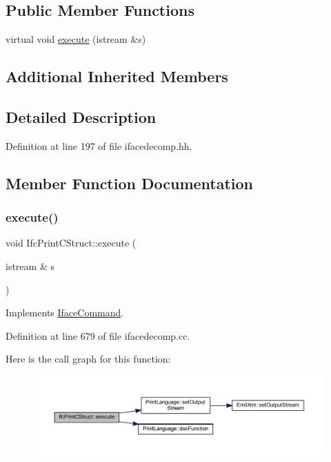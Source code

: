 \subsection*{Public Member Functions}
\begin{DoxyCompactItemize}
\item 
virtual void \mbox{\hyperlink{class_ifc_print_c_struct_a12d8b638868ba6f7eaa84e88421c0ab1}{execute}} (istream \&s)
\end{DoxyCompactItemize}
\subsection*{Additional Inherited Members}


\subsection{Detailed Description}


Definition at line 197 of file ifacedecomp.\+hh.



\subsection{Member Function Documentation}
\mbox{\label{class_ifc_print_c_struct_a12d8b638868ba6f7eaa84e88421c0ab1}} 
\subsubsection{\texorpdfstring{execute()}{execute()}}
{\footnotesize\ttfamily void Ifc\+Print\+C\+Struct\+::execute (\begin{DoxyParamCaption}\item[{istream \&}]{s }\end{DoxyParamCaption})\hspace{0.3cm}{\ttfamily [virtual]}}



Implements \mbox{\hyperlink{class_iface_command_af10e29cee2c8e419de6efe9e680ad201}{Iface\+Command}}.



Definition at line 679 of file ifacedecomp.\+cc.

Here is the call graph for this function\+:
\nopagebreak
\begin{figure}[H]
\begin{center}
\leavevmode
\includegraphics[width=350pt]{class_ifc_print_c_struct_a12d8b638868ba6f7eaa84e88421c0ab1_cgraph}
\end{center}
\end{figure}


